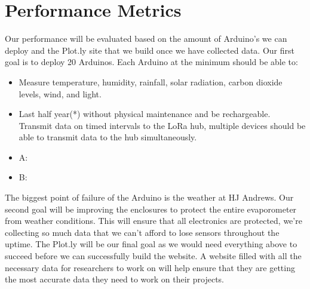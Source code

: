 \documentclass[onecolumn, draftclsnofoot,10pt, compsoc]{IEEEtran}
\begin{document}
\section {Performance Metrics}
Our performance will be evaluated based on the amount of Arduino’s we can deploy and the Plot.ly site that we build once we have collected data. 
\newline
Our first goal is to deploy 20 Arduinos.  Each Arduino at the minimum should be able to:
\begin{itemize}
\item Measure temperature, humidity, rainfall, solar radiation, carbon dioxide levels, wind, and light.
\item Last half year(*) without physical maintenance and be rechargeable.
Transmit data on timed intervals to the LoRa hub, multiple devices should be able to transmit data to the hub simultaneously. 
\item A:
\newline
\newline
\newline
\item B:
\newline
\newline
\newline
\end{itemize}
The biggest point of failure of the Arduino is the weather at HJ Andrews.  Our second goal will be improving the enclosures to protect the entire evaporometer from weather conditions.  This will ensure that all electronics are protected, we’re collecting so much data that we can’t afford to lose sensors throughout the uptime.
\newline
The Plot.ly will be our final goal as we would need everything above to succeed before we can successfully build the website. A website filled with all the necessary data for researchers to work on will help ensure that they are getting the most accurate data they need to work on their projects.  
\end{document}
